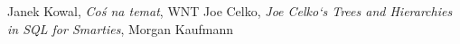 %
%

\clearpage
{}
{}
\begin{thebibliography}{99}
\thispagestyle{empty}

 Janek Kowal, 
    \emph{Coś na temat}, 
    WNT
 Joe Celko, 
    \emph{Joe Celko`s Trees and Hierarchies in SQL for Smarties}, 
    Morgan Kaufmann

\end{thebibliography} 


